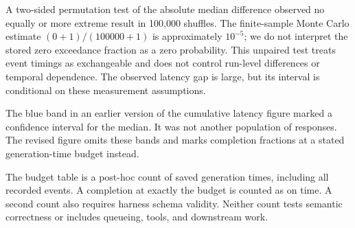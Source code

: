 A two-sided permutation test of the absolute median difference observed
no equally or more extreme result in 100,000 shuffles. The finite-sample
Monte Carlo estimate $(0+1)/(100000+1)$ is approximately $10^{-5}$;
we do not interpret the stored zero exceedance fraction as a zero
probability. This unpaired test treats event timings as exchangeable and
does not control run-level differences or temporal dependence. The
observed latency gap is large, but its interval is conditional on these
measurement assumptions.


The blue band in an earlier version of the cumulative latency figure
marked a confidence interval for the median. It was not another population
of responses. The revised figure omits these bands and marks completion
fractions at a stated generation-time budget instead.

The budget table is a post-hoc count of saved generation times, including
all recorded events. A completion at exactly the budget is counted as on
time. A second count also requires harness schema validity. Neither count
tests semantic correctness or includes queueing, tools, and downstream work.
